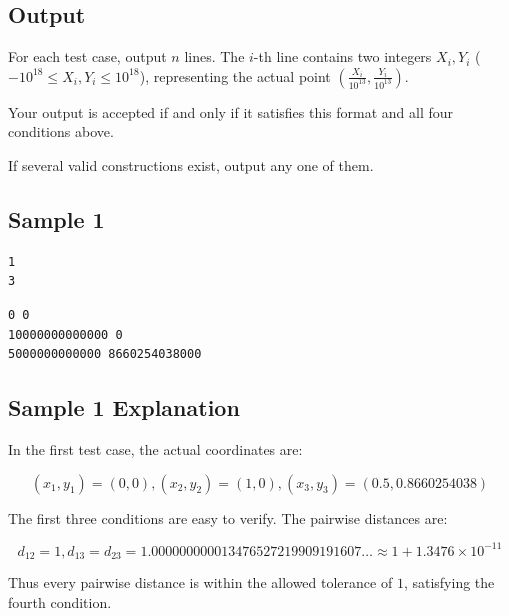 \subsection{Output}

For each test case, output $n$ lines. The $i$-th line contains two integers $X_i,Y_i$ ($-10^{18} \le X_i,Y_i \le 10^{18}$), representing the actual point $\left(\frac{X_i}{10^{13}},\frac{Y_i}{10^{13}}\right)$.

Your output is accepted if and only if it satisfies this format and all four conditions above.

If several valid constructions exist, output any one of them.

\subsection{Sample 1}

\begin{minipage}{\linewidth}
	\begin{minipage}[t]{0.49\linewidth}
		\begin{lstlisting}[title=\texttt{standard input}]
1
3
\end{lstlisting}
	\end{minipage}
	\begin{minipage}[t]{0.49\linewidth}
		\begin{lstlisting}[title=\texttt{standard output}]
0 0
10000000000000 0
5000000000000 8660254038000
\end{lstlisting}
	\end{minipage}
\end{minipage}


\subsection{Sample 1 Explanation}

In the first test case, the actual coordinates are:

\[
	(x_1, y_1) = (0, 0), (x_2, y_2) = (1, 0), (x_3, y_3) = (0.5, 0.8660254038)
\]

The first three conditions are easy to verify. The pairwise distances are:

\[d_{12} = 1, d_{13} = d_{23} = 1.000000000013476527219909191607\ldots \approx 1 + 1.3476 \times 10^{-11} \]

Thus every pairwise distance is within the allowed tolerance of $1$, satisfying the fourth condition.


